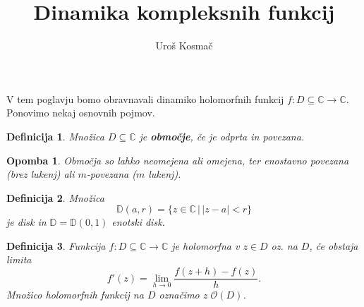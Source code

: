 \documentclass{article}
\title{Dinamika kompleksnih funkcij}
\author{Uroš Kosmač}
\newtheorem{definicija}{Definicija}
\newtheorem{opomba}{Opomba}
\newcommand{\C}{\mathbb{C}}
\newcommand{\D}{\mathbb{D}}
\newcommand{\Ho}{\mathcal{O}}
\begin{document}
\maketitle

V tem poglavju bomo obravnavali dinamiko holomorfnih funkcij
$f: D\subseteq \C \rightarrow \C.$ Ponovimo nekaj osnovnih pojmov.
\begin{definicija}
Množica $D \subseteq \C$ je \textbf{območje}, če je odprta in povezana.
\end{definicija}

\begin{opomba}
Območja so lahko neomejena ali omejena, ter enostavno povezana 
(brez lukenj) ali $m$-povezana ($m$ lukenj).
\end{opomba}

\begin{definicija}
Množica 
$$
\D(a, r) = \{z\in \C \,|\, |z - a| < r\}
$$
je disk in $\D = \D(0, 1)$ enotski disk.
\end{definicija}

\begin{definicija}
Funkcija $f: D\subseteq \C \rightarrow \C$ je holomorfna v $z\in D$ oz. na 
$D$, če obstaja limita 
\begin{equation}
f'(z) = \lim_{h\rightarrow 0} \frac{f(z + h) - f(z)}{h}.
\end{equation}
Množico holomorfnih funkcij na $D$ označimo z $\Ho(D)$.
\end{definicija}
\end{document}
